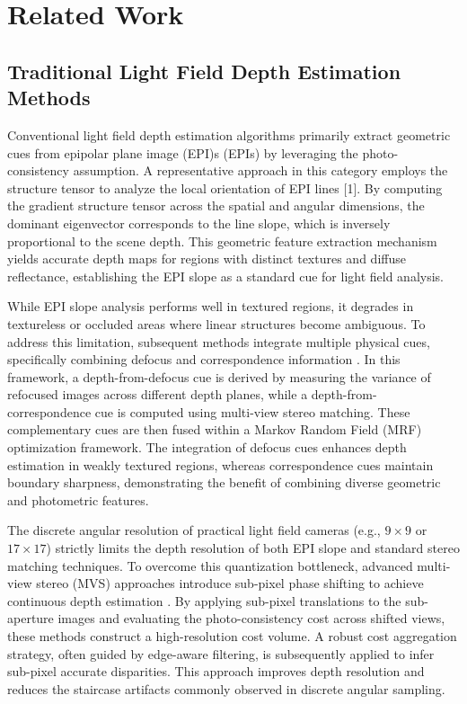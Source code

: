 \section{Related Work}

\subsection{Traditional Light Field Depth Estimation Methods}

Conventional light field depth estimation algorithms primarily extract geometric cues from epipolar plane image (EPI)s (EPIs) by leveraging the photo-consistency assumption. A representative approach in this category employs the structure tensor to analyze the local orientation of EPI lines [1]. By computing the gradient structure tensor across the spatial and angular dimensions, the dominant eigenvector corresponds to the line slope, which is inversely proportional to the scene depth. This geometric feature extraction mechanism yields accurate depth maps for regions with distinct textures and diffuse reflectance, establishing the EPI slope as a standard cue for light field analysis.

While EPI slope analysis performs well in textured regions, it degrades in textureless or occluded areas where linear structures become ambiguous. To address this limitation, subsequent methods integrate multiple physical cues, specifically combining defocus and correspondence information . In this framework, a depth-from-defocus cue is derived by measuring the variance of refocused images across different depth planes, while a depth-from-correspondence cue is computed using multi-view stereo matching. These complementary cues are then fused within a Markov Random Field (MRF) optimization framework. The integration of defocus cues enhances depth estimation in weakly textured regions, whereas correspondence cues maintain boundary sharpness, demonstrating the benefit of combining diverse geometric and photometric features.

The discrete angular resolution of practical light field cameras (e.g., $9 \times 9$ or $17 \times 17$) strictly limits the depth resolution of both EPI slope and standard stereo matching techniques. To overcome this quantization bottleneck, advanced multi-view stereo (MVS) approaches introduce sub-pixel phase shifting to achieve continuous depth estimation . By applying sub-pixel translations to the sub-aperture images and evaluating the photo-consistency cost across shifted views, these methods construct a high-resolution cost volume. A robust cost aggregation strategy, often guided by edge-aware filtering, is subsequently applied to infer sub-pixel accurate disparities. This approach improves depth resolution and reduces the staircase artifacts commonly observed in discrete angular sampling.

